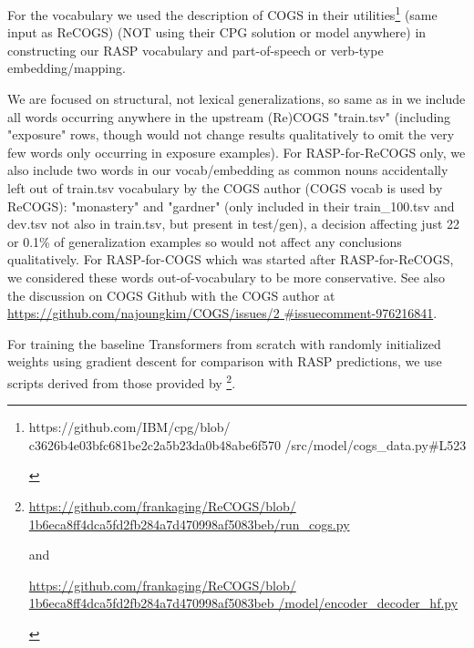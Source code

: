 \documentclass[11pt]{article}
\begin{document}
For the vocabulary we used the \cite{klinger2024compositionalprogramgenerationfewshot} description of COGS in their utilities\footnote{\begin{footnotesize}https://github.com/IBM/cpg/blob/
c3626b4e03bfc681be2c2a5b23da0b48abe6f570
/src/model/cogs\_data.py\#L523\end{footnotesize}} (same input as ReCOGS) (NOT using their CPG solution or model anywhere) in constructing our RASP vocabulary and part-of-speech or verb-type embedding/mapping. 

We are focused on structural, not lexical generalizations, so same as in \cite{klinger2024compositionalprogramgenerationfewshot} we include all words occurring anywhere in the upstream (Re)COGS "train.tsv" (including "exposure" rows, though would not change results qualitatively to omit the very few words only occurring in exposure examples). For RASP-for-ReCOGS only, we also include two words in our vocab/embedding as common nouns accidentally left out of train.tsv vocabulary by the COGS author (COGS vocab is used by ReCOGS): "monastery" and "gardner" (only included in their train\_100.tsv and dev.tsv not also in train.tsv, but present in test/gen), a decision affecting just 22 or 0.1\% of generalization examples so would not affect any conclusions qualitatively. For RASP-for-COGS which was started after RASP-for-ReCOGS, we considered these words out-of-vocabulary to be more conservative. See also the discussion on COGS Github with the COGS author at \href{https://github.com/najoungkim/COGS/issues/2\#issuecomment-976216841}{https://github.com/najoungkim/COGS/issues/2
\#issuecomment-976216841}.

For training the baseline Transformers from scratch with randomly initialized weights using gradient descent for comparison with RASP predictions, we use scripts derived from those provided by \cite{Wu2023}\footnote{\begin{footnotesize}\href{https://github.com/frankaging/ReCOGS/blob/1b6eca8ff4dca5fd2fb284a7d470998af5083beb/run\_cogs.py}{https://github.com/frankaging/ReCOGS/blob/
1b6eca8ff4dca5fd2fb284a7d470998af5083beb/run\_cogs.py}

and

\href{https://github.com/frankaging/ReCOGS/blob/1b6eca8ff4dca5fd2fb284a7d470998af5083beb/model/encoder\_decoder\_hf.py}{https://github.com/frankaging/ReCOGS/blob/
1b6eca8ff4dca5fd2fb284a7d470998af5083beb
/model/encoder\_decoder\_hf.py}\end{footnotesize}}.
\end{document}
